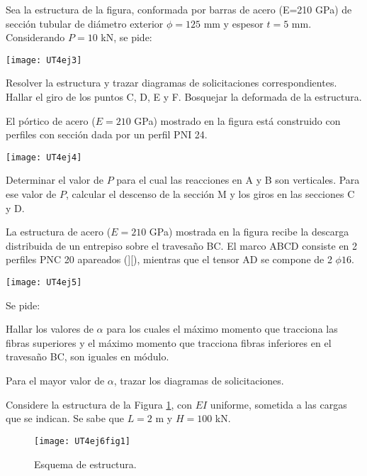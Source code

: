 \ejercicio

Sea la estructura de la figura, conformada por barras de acero (E=210 GPa) de sección tubular de diámetro exterior $\phi =125$ mm y espesor $t=5$ mm. Considerando $P=10$ kN, se pide:

\begin{center}
	\texttt{[image: UT4ej3]}
\end{center}

\parte Resolver la estructura y trazar diagramas de solicitaciones correspondientes.
\parte Hallar el giro de los puntos C, D, E y F. Bosquejar la deformada de la estructura.

\ejercicio

El pórtico de acero ($E=210$ GPa) mostrado en la figura está construido con perfiles con sección dada por un perfil PNI 24.

\begin{center}
	\texttt{[image: UT4ej4]}
\end{center}

\parte Determinar el valor de $P$  para el cual las reacciones en A y B son verticales.
\parte Para ese valor de $P$, calcular el descenso de la sección M y los giros en las secciones C y  D.

\ejercicio

La estructura de acero ($E=210$ GPa) mostrada en la figura recibe la descarga distribuida de un entrepiso sobre el travesaño BC. El marco ABCD consiste en 2 perfiles PNC 20 apareados (][), mientras que el tensor AD se compone de 2 $\phi 16$.

\begin{center}
	\texttt{[image: UT4ej5]}
\end{center}

Se pide:

\parte Hallar los valores de $\alpha$ para los cuales el máximo momento que tracciona las fibras superiores y el máximo momento que tracciona fibras inferiores en el travesaño BC, son iguales en módulo. 

\parte Para el mayor valor de $\alpha$, trazar los diagramas de solicitaciones.

\ejercicio

Considere la estructura de la Figura \ref{fig61}, con $EI$ uniforme, sometida a las cargas que se indican. Se sabe que $L=2$ m y $H= 100$ kN. %
%

\begin{figure}[htb]
	\centering
\texttt{[image: UT4ej6fig1]}
\caption{Esquema de estructura.}
\label{fig61}
\end{figure}

